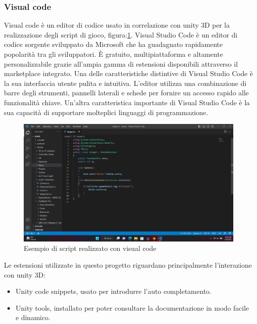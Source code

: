 \documentclass[
a4paper,
cleardoublepage=empty,
headings=twolinechapter,
numbers=autoenddot,
]{scrbook}
\begin{document}
    \subsubsection{Visual code}
    Visual code è un editor di codice usato in correlazione con unity 3D per la realizzazione degli script di gioco, figura:\ref{fig:visual_code}.
    Visual Studio Code è un editor di codice sorgente sviluppato da Microsoft che ha guadagnato rapidamente popolarità tra gli sviluppatori. È gratuito, multipiattaforma e altamente personalizzabile grazie all'ampia gamma di estensioni disponibili attraverso il marketplace integrato.
    Una delle caratteristiche distintive di Visual Studio Code è la sua interfaccia utente pulita e intuitiva. L'editor utilizza una combinazione di barre degli strumenti, pannelli laterali e schede per fornire un accesso rapido alle funzionalità chiave.
    Un'altra caratteristica importante di Visual Studio Code è la sua capacità di supportare molteplici linguaggi di programmazione.
    \begin{figure}[H]
    	\centering
    	\includegraphics[width=0.8\linewidth]{image/visual_code}
    	\caption{Esempio di script realizzato con visual code}
    	\label{fig:visual_code}
    \end{figure}
    Le estensioni utilizzate in questo progetto riguardano principalmente l'interazione con unity 3D:
    \begin{itemize}
    	\item Unity code snippets\cite{code-snippets}, usato per introdurre l'auto completamento.
    	\item Unity tools\cite{UnityTools}, installato per poter consultare la documentazione in modo facile e dinamico. 
    \end{itemize}
\end{document}
